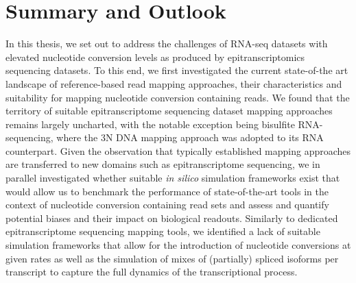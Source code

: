 
\chapter{Summary and Outlook}

In this thesis, we set out to address the challenges of RNA-seq datasets with elevated nucleotide conversion levels as produced by epitranscriptomics sequencing datasets. To this end, we first investigated the current state-of-the art landscape of reference-based read mapping approaches, their characteristics and suitability for mapping nucleotide conversion containing reads. We found that the territory of suitable epitranscriptome sequencing dataset mapping approaches remains largely uncharted, with the notable exception being bisulfite RNA-sequencing, where the 3N DNA mapping approach was adopted to its RNA counterpart. Given the observation that typically established mapping approaches are transferred to new domains such as epitranscriptome sequencing, we in parallel investigated whether suitable \textit{in silico} simulation frameworks exist that would allow us to benchmark the performance of state-of-the-art tools in the context of nucleotide conversion containing read sets and assess and quantify potential biases and their impact on biological readouts. Similarly to dedicated epitranscriptome sequencing mapping tools, we identified a lack of suitable simulation frameworks that allow for the introduction of nucleotide conversions at given rates as well as the simulation of mixes of (partially) spliced isoforms per transcript to capture the full dynamics of the transcriptional process. \\
